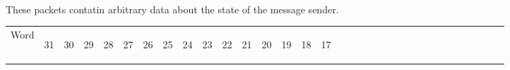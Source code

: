 \documentclass[11pt]{article}
\begin{document}
\paragraph{}
These packets contatin arbitrary data about the state of the message sender.
\newline
\begin{table}[h]
    \centering
    \label{tab:stateResponseDef}
    \begin{tabular}{|p{1cm}|m{0.04cm}|m{0.04cm}|m{0.04cm}|m{0.04cm}|m{0.04cm}|m{0.04cm}|m{0.04cm}|m{0.04cm}|m{0.04cm}|
        m{0.04cm}|m{0.04cm}|m{0.04cm}|m{0.04cm}|m{0.04cm}|m{0.04cm}|m{0.04cm}|m{0.04cm}|m{0.04cm}|m{0.04cm}|m{0.04cm}|
        m{0.04cm}|m{0.04cm}|m{0.04cm}|m{0.04cm}|m{0.04cm}|m{0.04cm}|m{0.04cm}|m{0.04cm}|m{0.04cm}|m{0.04cm}|m{0.04cm}|m{0.04cm}|}
        \hline
        Word & 
        \begin{sideways}31\end{sideways} &
        \begin{sideways}30\end{sideways} & 
        \begin{sideways}29\end{sideways} &
        \begin{sideways}28\end{sideways} &
        \begin{sideways}27\end{sideways} &
        \begin{sideways}26\end{sideways} &
        \begin{sideways}25\end{sideways} &
        \begin{sideways}24\end{sideways} &
        \begin{sideways}23\end{sideways} &
        \begin{sideways}22\end{sideways} &
        \begin{sideways}21\end{sideways} &
        \begin{sideways}20\end{sideways} &
        \begin{sideways}19\end{sideways} &
        \begin{sideways}18\end{sideways} &
        \begin{sideways}17\end{sideways} &

\end{tabular}
\end{table}
\end{document}

